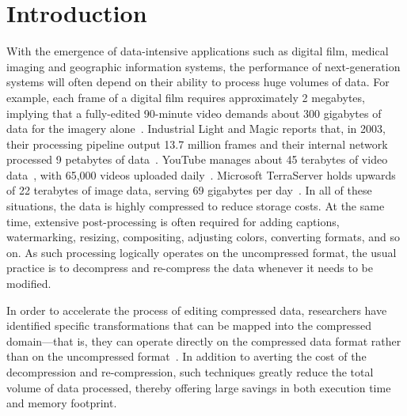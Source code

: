 \section{Introduction}

With the emergence of data-intensive applications such as digital
film, medical imaging and geographic information systems, the
performance of next-generation systems will often depend on their
ability to process huge volumes of data.  For example, each frame of a
digital film requires approximately 2 megabytes, implying that a
fully-edited 90-minute video demands about 300 gigabytes of data for
the imagery alone~\cite{ibm-video}.  Industrial Light and Magic
reports that, in 2003, their processing pipeline output 13.7 million
frames and their internal network processed 9 petabytes of
data~\cite{ilm-interview}.  YouTube manages about 45 terabytes of
video data~\cite{wsj-youtube}, with 65,000 videos uploaded
daily~\cite{youtube}.  Microsoft TerraServer holds upwards of 22
terabytes of image data, serving 69 gigabytes per
day~\cite{terraserver}.  In all of these situations, the data is
highly compressed to reduce storage costs.  At the same time,
extensive post-processing is often required for adding captions,
watermarking, resizing, compositing, adjusting colors, converting
formats, and so on.  As such processing logically operates on the
uncompressed format, the usual practice is to decompress and
re-compress the data whenever it needs to be modified.


In order to accelerate the process of editing compressed data,
researchers have identified specific transformations that can be
mapped into the compressed domain---that is, they can operate directly
on the compressed data format rather than on the uncompressed
format~\cite{chang95survey,mandal95survey,smith95survey,wee02survey}.
In addition to averting the cost of the decompression and
re-compression, such techniques greatly reduce the total volume of
data processed, thereby offering large savings in both execution time
and memory footprint.


